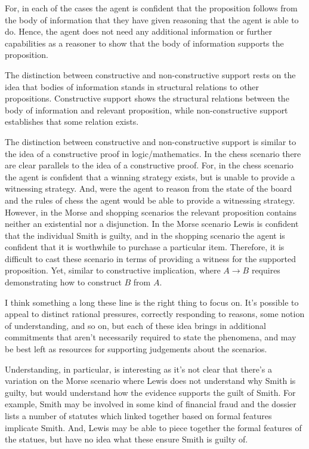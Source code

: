 \documentclass[10pt]{article}
\begin{document}
For, in each of the cases the agent is confident that the proposition follows from the body of information that they have given reasoning that the agent is able to do.
Hence, the agent does not need any additional information or further capabilities as a reasoner to show that the body of information supports the proposition.

The distinction between constructive and non-constructive support rests on the idea that bodies of information stands in structural relations to other propositions.
Constructive support shows the structural relations between the body of information and relevant proposition, while non-constructive support establishes that some relation exists.


The distinction between constructive and non-constructive support is similar to the idea of a constructive proof in logic/mathematics.
In the chess scenario there are clear parallels to the idea of a constructive proof.
For, in the chess scenario the agent is confident that a winning strategy exists, but is unable to provide a witnessing strategy.
And, were the agent to reason from the state of the board and the rules of chess the agent would be able to provide a witnessing strategy.
However, in the Morse and shopping scenarios the relevant proposition contains neither an existential nor a disjunction.
In the Morse scenario Lewis is confident that the individual Smith is guilty, and in the shopping scenario the agent is confident that it is worthwhile to purchase a particular item.
Therefore, it is difficult to cast these scenario in terms of providing a witness for the supported proposition.
Yet, similar to constructive implication, where \(A \rightarrow B\) requires demonstrating how to construct \(B\) from \(A\).

\begin{note}
  I think something a long these line is the right thing to focus on.
  It's possible to appeal to distinct rational pressures, correctly responding to reasons, some notion of understanding, and so on, but each of these idea brings in additional commitments that aren't necessarily required to state the phenomena, and may be best left as resources for supporting judgements about the scenarios.

  Understanding, in particular, is interesting as it's not clear that there's a variation on the Morse scenario where Lewis does not understand why Smith is guilty, but would understand how the evidence supports the guilt of Smith.
  For example, Smith may be involved in some kind of financial fraud and the dossier lists a number of statutes which linked together based on formal features implicate Smith.
  And, Lewis may be able to piece together the formal features of the statues, but have no idea what these ensure Smith is guilty of.
\end{note}
\end{document}
